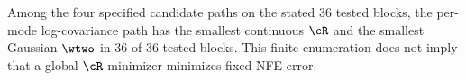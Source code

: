 Among the four specified candidate paths on the stated 36 tested blocks, the per-mode log-covariance path has the smallest continuous $\cR$ and the smallest Gaussian $\wtwo$ in 36 of 36 tested blocks. This finite enumeration does not imply that a global $\cR$-minimizer minimizes fixed-NFE error.
